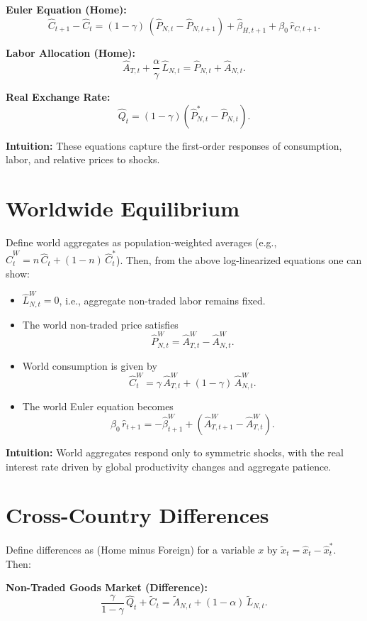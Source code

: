 \documentclass[a4paper,12pt]{article} %
\theoremstyle{nonitalic}
\begin{document}
\textbf{Euler Equation (Home):}
\[
\hat{C}_{t+1}-\hat{C}_t = (1-\gamma)\,(\hat{P}_{N,t}-\hat{P}_{N,t+1}) + \hat{\beta}_{H,t+1} + \beta_0\,\hat{r}_{C,t+1}. \tag{7c}
\]

\textbf{Labor Allocation (Home):}
\[
\hat{A}_{T,t} + \frac{\alpha}{\gamma}\,\hat{L}_{N,t} = \hat{P}_{N,t} + \hat{A}_{N,t}. \tag{7d}
\]

\textbf{Real Exchange Rate:}
\[
\hat{Q}_t = (1-\gamma)(\hat{P}^*_{N,t}-\hat{P}_{N,t}).
\]

\textbf{Intuition:} These equations capture the first-order responses of consumption, labor, and relative prices to shocks.

\section{Worldwide Equilibrium}

Define world aggregates as population-weighted averages (e.g., \( \hat{C}^W_t = n\,\hat{C}_t + (1-n)\,\hat{C}^*_t \)). Then, from the above log-linearized equations one can show:
\begin{itemize}
    \item \(\hat{L}^W_{N,t} = 0\), i.e., aggregate non-traded labor remains fixed.
    \item The world non-traded price satisfies
    \[
    \hat{P}^W_{N,t} = \hat{A}^W_{T,t} - \hat{A}^W_{N,t}.
    \]
    \item World consumption is given by
    \[
    \hat{C}^W_t = \gamma\,\hat{A}^W_{T,t} + (1-\gamma)\,\hat{A}^W_{N,t}.
    \]
    \item The world Euler equation becomes
    \[
    \beta_0\,\hat{r}_{t+1} = -\hat{\beta}^W_{t+1} + \left(\hat{A}^W_{T,t+1}-\hat{A}^W_{T,t}\right).
    \]
\end{itemize}

\textbf{Intuition:} World aggregates respond only to symmetric shocks, with the real interest rate driven by global productivity changes and aggregate patience.

\section{Cross-Country Differences}

Define differences as (Home minus Foreign) for a variable \( x \) by \( \tilde{x}_t = \hat{x}_t - \hat{x}^*_t \). Then:

\textbf{Non-Traded Goods Market (Difference):}
\[
\frac{\gamma}{1-\gamma}\,\hat{Q}_t + \tilde{C}_t = \tilde{A}_{N,t} + (1-\alpha)\,\tilde{L}_{N,t}. \tag{9a}
\]
\end{document}
